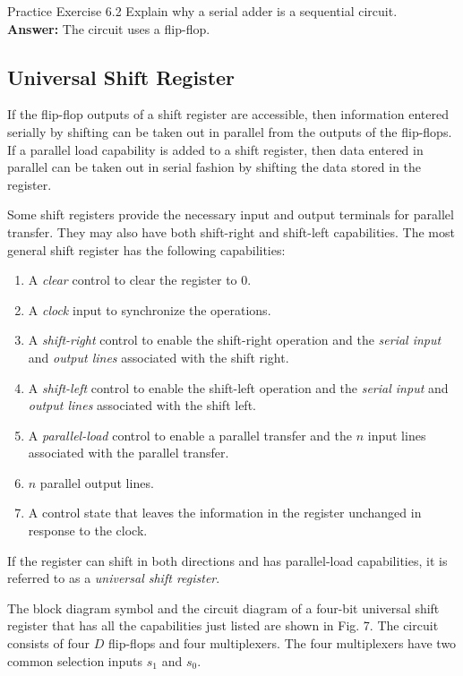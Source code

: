 \begin{practice}{Practice Exercise 6.2}
Explain why a serial adder is a sequential circuit.\\

\textbf{Answer:} The circuit uses a flip-flop.
\end{practice}

\subsection{Universal Shift Register}
\label{subsec:universal-shift-register}

If the flip-flop outputs of a shift register are accessible, then information entered serially by shifting can be taken out in parallel from the outputs of the flip-flops. If a parallel load capability is added to a shift register, then data entered in parallel can be taken out in serial fashion by shifting the data stored in the register.

Some shift registers provide the necessary input and output terminals for parallel transfer. They may also have both shift-right and shift-left capabilities. The most general shift register has the following capabilities:
\begin{enumerate}[leftmargin=0.7cm]
  \item A \textit{clear} control to clear the register to 0.
  \item A \textit{clock} input to synchronize the operations.
  \item A \textit{shift-right} control to enable the shift-right operation and the \textit{serial input} and \textit{output lines} associated with the shift right.
  \item A \textit{shift-left} control to enable the shift-left operation and the \textit{serial input} and \textit{output lines} associated with the shift left.
  \item A \textit{parallel-load} control to enable a parallel transfer and the $n$ input lines associated with the parallel transfer.
  \item $n$ parallel output lines.
  \item A control state that leaves the information in the register unchanged in response to the clock.
\end{enumerate}

If the register can shift in both directions and has parallel-load capabilities, it is referred to as a \textit{universal shift register}.

The block diagram symbol and the circuit diagram of a four-bit universal shift register that has all the capabilities just listed are shown in Fig. 7. The circuit consists of four $D$ flip-flops and four multiplexers. The four multiplexers have two common selection inputs $s_1$ and $s_0$.

